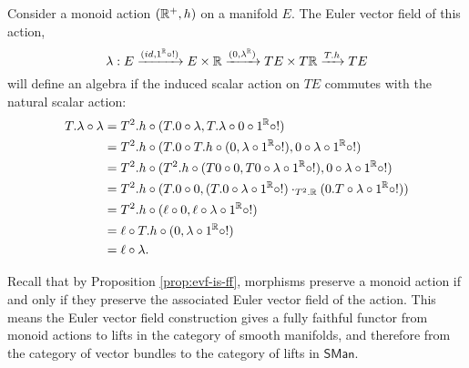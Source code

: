\begin{example}
\begin{enumerate}[(i)]
      Consider a monoid action $(\mathbb{R}^+, h)$ on a manifold $E$. The Euler vector field of this action, 
      \[
          \lambda: E \xrightarrow[]{(id, 1^{\mathbb{R}} \circ !)} E \times \mathbb{R} \xrightarrow{(0,\lambda^{\mathbb{R}})} TE \times T\mathbb{R} \xrightarrow{T.h} TE
      \]
      will define an algebra if the induced scalar action on $TE$ commutes with the natural scalar action:
      \begin{align*}
          T.\lambda \circ \lambda
          &= T^2.h \circ (T.0 \circ\lambda, T.\lambda \circ 0\circ 1^{\mathbb{R}} \circ !) \\
          &= T^2.h \circ (T.0 \circ T.h \circ (0, \lambda \circ 1^{\mathbb{R}} \circ !), 0 \circ \lambda \circ 1^{\mathbb{R}} \circ !) \\
          &= T^2.h \circ (T^2.h\circ (T0\circ 0, T0 \circ \lambda \circ 1^{\mathbb{R}} \circ !), 0 \circ \lambda \circ 1^{\mathbb{R}} \circ !) \\
          &= T^2.h \circ (T.0 \circ 0, (T.0 \circ \lambda \circ 1^{\mathbb{R}} \circ !) \cdot_{T^2.\mathbb{R}}( 0.T \circ  \lambda \circ 1^{\mathbb{R}} \circ !) ) \\
          &= T^2.h \circ (\ell \circ 0, \ell \circ \lambda \circ 1^{\mathbb{R}} \circ !)  \\
          &= \ell \circ T.h \circ  (0, \lambda \circ 1^{\mathbb{R}} \circ !) \\
          &= \ell \circ \lambda.
      \end{align*}
  \end{enumerate}
\end{example}
\begin{observation}\label{obs:evf-is-ff}
  Recall that by Proposition \ref{prop:evf-is-ff}, morphisms preserve a monoid action if and only if they preserve the associated Euler vector field of the action. This means the Euler vector field construction gives a fully faithful functor from monoid actions to lifts in the category of smooth manifolds, and therefore from the category of vector bundles to the category of lifts in $\mathsf{SMan}$.
\end{observation}

